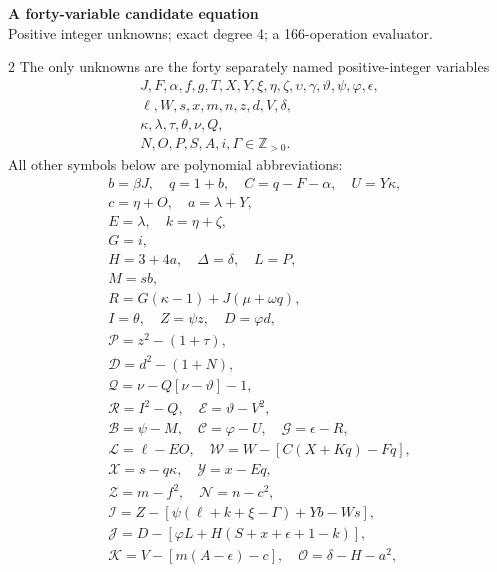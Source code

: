 \documentclass[10pt]{article}
\begin{document}
\begin{center}
{\large\bfseries A forty-variable candidate equation}\\[-1pt]
{\small Positive integer unknowns; exact degree 4; a 166-operation evaluator.}
\end{center}\vspace{-8pt}
\begin{multicols}{2}
\fontsize{8.6}{9.1}\selectfont
The only unknowns are the forty separately named positive-integer variables
\[
\begin{gathered}J,F,\alpha,f,g,T,X,Y,\xi,\eta,\zeta,\upsilon,\gamma,\vartheta,\psi,\varphi,\epsilon,\\
\ell,W,s,x,m,n,z,d,V,\delta,\\
\kappa,\lambda,\tau,\theta,\nu,Q,\\
N,O,P,S,A,i,\Gamma\in\mathbb Z_{>0}.\end{gathered}
\]
All other symbols below are polynomial abbreviations:
\[
\begin{gathered}
b=\beta J,\quad q=1+b,\quad C=q-F-\alpha,\quad U=Y\kappa,\\
c=\eta+O,\quad a=\lambda+Y,\\
E=\lambda,\quad k=\eta+\zeta,\\
G=i,\\
H=3+4a,\quad\Delta=\delta,\quad L=P,\\
M=sb,\\
R=G(\kappa-1)+J(\mu+\omega q),\\
I=\theta,\quad Z=\psi z,\quad D=\varphi d,\\
\mathcal{P}=z^2-(1+\tau),\\
\mathcal{D}=d^2-(1+N),\\
\mathcal{Q}=\nu-Q[\nu-\vartheta]-1,\\
\mathcal{R}=I^2-Q,\quad \mathcal{E}=\vartheta-V^2,\\
\mathcal{B}=\psi-M,\quad \mathcal{C}=\varphi-U,\quad \mathcal{G}=\epsilon-R,\\
\mathcal{L}=\ell-EO,\quad \mathcal{W}=W-[C(X+Kq)-Fq],\\
\mathcal{X}=s-q\kappa,\quad \mathcal{Y}=x-Eq,\\
\mathcal{Z}=m-f^2,\quad \mathcal{N}=n-c^2,\\
\mathcal{I}=Z-[\psi(\ell+k+\xi-\Gamma)+Yb-Ws],\\
\mathcal{J}=D-[\varphi L+H(S+x+\epsilon+1-k)],\\
\mathcal{K}=V-[m(A-\epsilon)-c],\quad\mathcal{O}=\delta-H-a^2,\\

\end{gathered}\]
\end{multicols}
\end{document}
